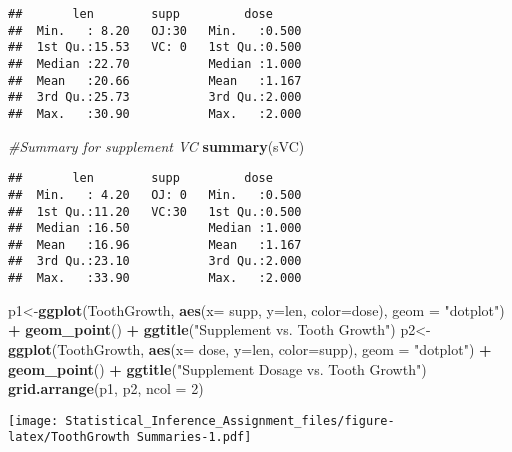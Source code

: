 \documentclass[]{article}
\newenvironment{Shaded}{\begin{snugshade}}{\end{snugshade}}
\newcommand{\KeywordTok}[1]{\textcolor[rgb]{0.13,0.29,0.53}{\textbf{#1}}}
\newcommand{\DataTypeTok}[1]{\textcolor[rgb]{0.13,0.29,0.53}{#1}}
\newcommand{\DecValTok}[1]{\textcolor[rgb]{0.00,0.00,0.81}{#1}}
\newcommand{\StringTok}[1]{\textcolor[rgb]{0.31,0.60,0.02}{#1}}
\newcommand{\CommentTok}[1]{\textcolor[rgb]{0.56,0.35,0.01}{\textit{#1}}}
\newcommand{\OperatorTok}[1]{\textcolor[rgb]{0.81,0.36,0.00}{\textbf{#1}}}
\newcommand{\NormalTok}[1]{#1}
\begin{document}
\begin{verbatim}
##       len        supp         dose      
##  Min.   : 8.20   OJ:30   Min.   :0.500  
##  1st Qu.:15.53   VC: 0   1st Qu.:0.500  
##  Median :22.70           Median :1.000  
##  Mean   :20.66           Mean   :1.167  
##  3rd Qu.:25.73           3rd Qu.:2.000  
##  Max.   :30.90           Max.   :2.000
\end{verbatim}

\begin{Shaded}
\begin{Highlighting}[]
\CommentTok{#Summary for supplement VC}
\KeywordTok{summary}\NormalTok{(sVC)}
\end{Highlighting}
\end{Shaded}

\begin{verbatim}
##       len        supp         dose      
##  Min.   : 4.20   OJ: 0   Min.   :0.500  
##  1st Qu.:11.20   VC:30   1st Qu.:0.500  
##  Median :16.50           Median :1.000  
##  Mean   :16.96           Mean   :1.167  
##  3rd Qu.:23.10           3rd Qu.:2.000  
##  Max.   :33.90           Max.   :2.000
\end{verbatim}

\begin{Shaded}
\begin{Highlighting}[]
\NormalTok{p1<-}\KeywordTok{ggplot}\NormalTok{(ToothGrowth, }\KeywordTok{aes}\NormalTok{(}\DataTypeTok{x=}\NormalTok{ supp, }\DataTypeTok{y=}\NormalTok{len, }\DataTypeTok{color=}\NormalTok{dose), }\DataTypeTok{geom =} \StringTok{"dotplot"}\NormalTok{) }\OperatorTok{+}\StringTok{ }\KeywordTok{geom_point}\NormalTok{() }\OperatorTok{+}\StringTok{ }
\StringTok{      }\KeywordTok{ggtitle}\NormalTok{(}\StringTok{"Supplement vs. Tooth Growth"}\NormalTok{)}
\NormalTok{p2<-}\KeywordTok{ggplot}\NormalTok{(ToothGrowth, }\KeywordTok{aes}\NormalTok{(}\DataTypeTok{x=}\NormalTok{ dose, }\DataTypeTok{y=}\NormalTok{len, }\DataTypeTok{color=}\NormalTok{supp), }\DataTypeTok{geom =} \StringTok{"dotplot"}\NormalTok{) }\OperatorTok{+}\StringTok{ }\KeywordTok{geom_point}\NormalTok{() }\OperatorTok{+}\StringTok{ }
\StringTok{      }\KeywordTok{ggtitle}\NormalTok{(}\StringTok{"Supplement Dosage vs. Tooth Growth"}\NormalTok{)}
\KeywordTok{grid.arrange}\NormalTok{(p1, p2, }\DataTypeTok{ncol =} \DecValTok{2}\NormalTok{)}
\end{Highlighting}
\end{Shaded}

\texttt{[image: Statistical\_Inference\_Assignment\_files/figure-latex/ToothGrowth Summaries-1.pdf]}
\end{document}
